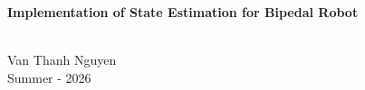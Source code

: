 \documentclass[11pt,a4paper]{article}
\numberwithin{equation}{section}
\begin{document}
\begin{center}
\begin{Large}
    \textbf{Implementation of State Estimation for Bipedal Robot}
\end{Large}
\\
Van Thanh Nguyen\\
Summer - 2026
\end{center}


\newpage

\end{document}
